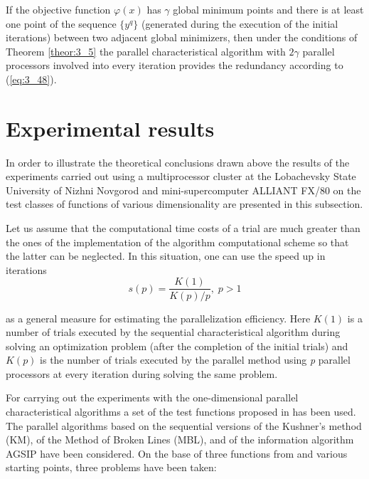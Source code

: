 	\begin{corollary} If the objective function $\varphi (x)$ has $\gamma $ global minimum points and there is at least one point of the sequence $\{ y^q \} $ (generated during the execution of the initial iterations) between two adjacent global minimizers, then under the conditions of Theorem \ref{theor:3_5} the parallel characteristical algorithm with $2\gamma $ parallel processors involved into every iteration provides the redundancy according to  (\ref{eq:3_48}).
	\end{corollary}
	
	\section{ Experimental results}
	
	In order to illustrate the theoretical conclusions drawn above the results of the experiments carried out using a multiprocessor cluster at the Lobachevsky State University of Nizhni Novgorod and mini-supercomputer ALLIANT FX/80 on the test classes of functions of various dimensionality are presented in this subsection.
	
	Let us assume that the computational time costs of a trial are much greater than the ones of the implementation of the algorithm computational scheme so that the latter can be neglected. In this situation, one can use the speed up in iterations 
	\begin{equation*}
	s(p)=\frac{K(1)}{K(p)/p} ,\; p>1
	\end{equation*}
	
	as a general measure for estimating the parallelization efficiency. Here $K(1)$ is a number of trials executed by the sequential characteristical algorithm during solving an optimization problem (after the completion of the initial trials) and $K(p)$ is the number of trials executed by the parallel method using \textit{p} parallel processors at every iteration during solving the same problem. 
	
	For carrying out the experiments with the one-dimensional parallel characteristical algorithms a set of the test functions proposed in \cite{3_HansenJaumardLu} has been used. The parallel algorithms based on the sequential versions of the Kushner's method (KM), of the Method of Broken Lines (MBL), and of the information algorithm AGSIP have been considered. On the base of three functions from \cite{3_HansenJaumardLu} and various starting points, three problems have been taken:
	

